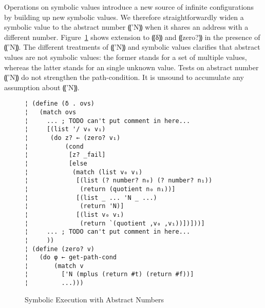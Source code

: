 Operations on symbolic values introduce a new source of infinite configurations
by building up new symbolic values.
We therefore straightforwardly widen a symbolic value to the abstract
number ⸨'N⸩ when it shares an address with a different number.
Figure~\ref{f:symbolic-widen} shows extension to ⸨δ⸩ and ⸨zero?⸩
in the presence of ⸨'N⸩.
The different treatments of ⸨'N⸩ and symbolic values
clarifies that abstract values are not symbolic values:
the former stands for a set of multiple values,
whereas the latter stands for an single unknown value.
Tests on abstract number ⸨'N⸩ do not strengthen the path-condition.
It is unsound to accumulate any assumption about ⸨'N⸩.

\begin{figure}
\begin{lstlisting}
¦ (define (δ . ovs)
¦   (match ovs
¦     ... ; TODO can't put comment in here...
¦     [(list '/ v₀ v₁)
¦      (do z? ← (zero? v₁)
¦          (cond
¦           [z? _fail]
¦           [else
¦            (match (list v₀ v₁)
¦             [(list (? number? n₀) (? number? n₁))
¦              (return (quotient n₀ n₁))]
¦             [(list _ ... 'N _ ...)
¦              (return 'N)]
¦             [(list v₀ v₁)
¦              (return `(quotient ,v₀ ,v₁))])]))]
¦     ... ; TODO can't put comment in here...
¦     ))
¦ (define (zero? v)
¦   (do φ ← get-path-cond
¦       (match v
¦         ['N (mplus (return #t) (return #f))]
¦         ...)))
\end{lstlisting}
\caption{Symbolic Execution with Abstract Numbers}
\label{f:symbolic-widen}
\end{figure}
